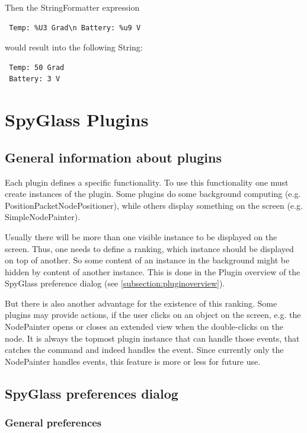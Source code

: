 Then the StringFormatter expression

\begin{verbatim}
 Temp: %U3 Grad\n Battery: %u9 V
\end{verbatim}

would result into the following String:

\begin{verbatim}
 Temp: 50 Grad
 Battery: 3 V
\end{verbatim}

\newpage
\section{SpyGlass Plugins}
\label{section:plugins}

\subsection{General information about plugins}

Each plugin defines a specific functionality. To use this functionality one must create instances of the plugin.
Some plugins do some background computing (e.g. PositionPacketNodePositioner), while others display something
on the screen (e.g. SimpleNodePainter).

Usually there will be more than one visible instance to be displayed on the screen. Thus, one needs to define a ranking,
which instance should be displayed on top of another. So some content of an instance in the background might be hidden
by content of another instance. This is done in the
Plugin overview of the SpyGlass preference dialog (see \ref{subsection:pluginoverview}).

But there is also another advantage for the existence of this ranking. Some plugins may provide actions, if the user
clicks on an object on the screen, e.g. the NodePainter opens or closes an extended view when the double-clicks on
the node. It is always the topmost plugin instance that can handle those events, that catches the command and indeed
handles the event. Since currently only the NodePainter handles events, this feature is more or less for
future use.

\subsection{SpyGlass preferences dialog}

\subsubsection{General preferences}
\label{section:generalpreferences}

